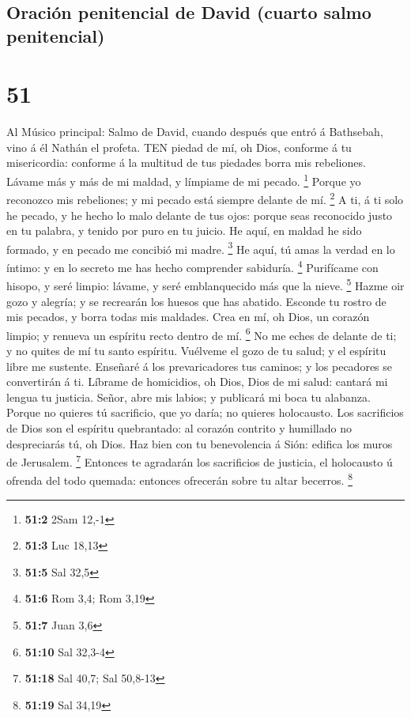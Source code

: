\hypertarget{oraciuxf3n-penitencial-de-david-cuarto-salmo-penitencial}{%
\subsection{Oración penitencial de David (cuarto salmo
penitencial)}\label{oraciuxf3n-penitencial-de-david-cuarto-salmo-penitencial}}

\hypertarget{section-50}{%
\section{51}\label{section-50}}

 Al Músico principal: Salmo de David, cuando después que
entró á Bathsebah, vino á él Nathán el profeta. TEN piedad de mí, oh
Dios, conforme á tu misericordia: conforme á la multitud de tus piedades
borra mis rebeliones.  Lávame más y más de mi maldad, y
límpiame de mi pecado. \footnote{\textbf{51:2} 2Sam 12,-1} 
Porque yo reconozco mis rebeliones; y mi pecado está siempre delante de
mí. \footnote{\textbf{51:3} Luc 18,13}  A ti, á ti solo he
pecado, y he hecho lo malo delante de tus ojos: porque seas reconocido
justo en tu palabra, y tenido por puro en tu juicio.  He
aquí, en maldad he sido formado, y en pecado me concibió mi madre.
\footnote{\textbf{51:5} Sal 32,5}  He aquí, tú amas la
verdad en lo íntimo: y en lo secreto me has hecho comprender sabiduría.
\footnote{\textbf{51:6} Rom 3,4; Rom 3,19}  Purifícame con
hisopo, y seré limpio: lávame, y seré emblanquecido más que la nieve.
\footnote{\textbf{51:7} Juan 3,6}  Hazme oir gozo y alegría;
y se recrearán los huesos que has abatido.  Esconde tu
rostro de mis pecados, y borra todas mis maldades.  Crea en
mí, oh Dios, un corazón limpio; y renueva un espíritu recto dentro de
mí. \footnote{\textbf{51:10} Sal 32,3-4}  No me eches de
delante de ti; y no quites de mí tu santo espíritu. 
Vuélveme el gozo de tu salud; y el espíritu libre me sustente.
 Enseñaré á los prevaricadores tus caminos; y los pecadores
se convertirán á ti.  Líbrame de homicidios, oh Dios, Dios
de mi salud: cantará mi lengua tu justicia.  Señor, abre
mis labios; y publicará mi boca tu alabanza.  Porque no
quieres tú sacrificio, que yo daría; no quieres holocausto.
 Los sacrificios de Dios son el espíritu quebrantado: al
corazón contrito y humillado no despreciarás tú, oh Dios. 
Haz bien con tu benevolencia á Sión: edifica los muros de Jerusalem.
\footnote{\textbf{51:18} Sal 40,7; Sal 50,8-13}  Entonces
te agradarán los sacrificios de justicia, el holocausto ú ofrenda del
todo quemada: entonces ofrecerán sobre tu altar becerros. \footnote{\textbf{51:19}
  Sal 34,19}

